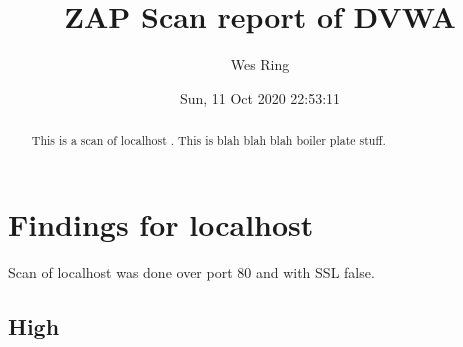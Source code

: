 \documentclass[10pt]{article}
\title{ZAP Scan report of DVWA}
\author{Wes Ring}
\date{Sun, 11 Oct 2020 22:53:11}
\begin{document}
\null  %
\nointerlineskip  %
\vfill
\let\snewpage \newpage
\let\newpage \relax
\maketitle
\let \newpage \snewpage
\vfill 
\newpage

{\hypersetup{linktoc=all,hidelinks}
\tableofcontents
}

\newpage
\begin{abstract}
This is a scan of localhost
. This is blah blah blah boiler plate stuff.
\end{abstract}
\section{Findings for localhost}
Scan of localhost was done over port 80 and with SSL false.
\subsection{High}
\end{document}
